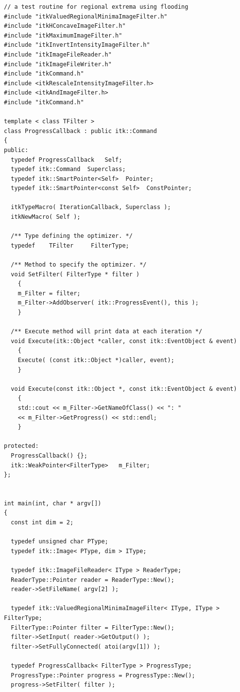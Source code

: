 \documentclass{llncs}
\begin{document}
\lstset{language=C,  basicstyle=\small}
\begin{lstlisting}
// a test routine for regional extrema using flooding
#include "itkValuedRegionalMinimaImageFilter.h"
#include "itkHConcaveImageFilter.h"
#include "itkMaximumImageFilter.h"
#include "itkInvertIntensityImageFilter.h"
#include "itkImageFileReader.h"
#include "itkImageFileWriter.h"
#include "itkCommand.h"
#include <itkRescaleIntensityImageFilter.h>
#include <itkAndImageFilter.h>
#include "itkCommand.h"

template < class TFilter >
class ProgressCallback : public itk::Command
{
public:
  typedef ProgressCallback   Self;
  typedef itk::Command  Superclass;
  typedef itk::SmartPointer<Self>  Pointer;
  typedef itk::SmartPointer<const Self>  ConstPointer;

  itkTypeMacro( IterationCallback, Superclass );
  itkNewMacro( Self );

  /** Type defining the optimizer. */
  typedef    TFilter     FilterType;

  /** Method to specify the optimizer. */
  void SetFilter( FilterType * filter )
    {
    m_Filter = filter;
    m_Filter->AddObserver( itk::ProgressEvent(), this );
    }

  /** Execute method will print data at each iteration */
  void Execute(itk::Object *caller, const itk::EventObject & event)
    {
    Execute( (const itk::Object *)caller, event);
    }

  void Execute(const itk::Object *, const itk::EventObject & event)
    {
    std::cout << m_Filter->GetNameOfClass() << ": " 
	<< m_Filter->GetProgress() << std::endl;
    }

protected:
  ProgressCallback() {};
  itk::WeakPointer<FilterType>   m_Filter;
};


int main(int, char * argv[])
{
  const int dim = 2;
  
  typedef unsigned char PType;
  typedef itk::Image< PType, dim > IType;

  typedef itk::ImageFileReader< IType > ReaderType;
  ReaderType::Pointer reader = ReaderType::New();
  reader->SetFileName( argv[2] );

  typedef itk::ValuedRegionalMinimaImageFilter< IType, IType > FilterType;
  FilterType::Pointer filter = FilterType::New();
  filter->SetInput( reader->GetOutput() );
  filter->SetFullyConnected( atoi(argv[1]) );

  typedef ProgressCallback< FilterType > ProgressType;
  ProgressType::Pointer progress = ProgressType::New();
  progress->SetFilter( filter );


\end{lstlisting}
\end{document}
